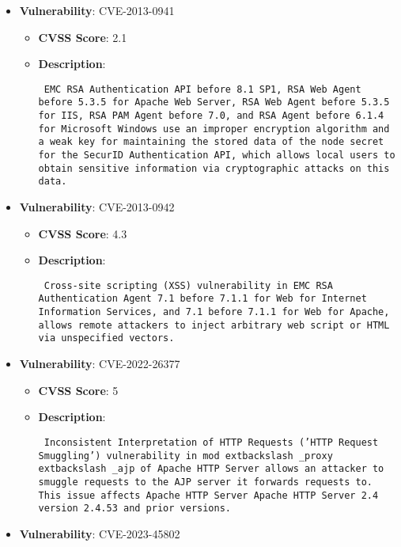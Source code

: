 \documentclass{article}
\begin{document}
\begin{itemize}
        \item \textbf{Vulnerability}: CVE-2013-0941
        \begin{itemize}
            \item \textbf{CVSS Score}:  2.1 
            \item \textbf{Description}: \parbox{\linewidth}{\texttt{ EMC RSA Authentication API before 8.1 SP1, RSA Web Agent before 5.3.5 for Apache Web Server, RSA Web Agent before 5.3.5 for IIS, RSA PAM Agent before 7.0, and RSA Agent before 6.1.4 for Microsoft Windows use an improper encryption algorithm and a weak key for maintaining the stored data of the node secret for the SecurID Authentication API, which allows local users to obtain sensitive information via cryptographic attacks on this data. }}
        \end{itemize}
    
        \item \textbf{Vulnerability}: CVE-2013-0942
        \begin{itemize}
            \item \textbf{CVSS Score}:  4.3 
            \item \textbf{Description}: \parbox{\linewidth}{\texttt{ Cross-site scripting (XSS) vulnerability in EMC RSA Authentication Agent 7.1 before 7.1.1 for Web for Internet Information Services, and 7.1 before 7.1.1 for Web for Apache, allows remote attackers to inject arbitrary web script or HTML via unspecified vectors. }}
        \end{itemize}
    
        \item \textbf{Vulnerability}: CVE-2022-26377
        \begin{itemize}
            \item \textbf{CVSS Score}:  5 
            \item \textbf{Description}: \parbox{\linewidth}{\texttt{ Inconsistent Interpretation of HTTP Requests ('HTTP Request Smuggling') vulnerability in mod	extbackslash _proxy	extbackslash _ajp of Apache HTTP Server allows an attacker to smuggle requests to the AJP server it forwards requests to. This issue affects Apache HTTP Server Apache HTTP Server 2.4 version 2.4.53 and prior versions. }}
        \end{itemize}
    
        \item \textbf{Vulnerability}: CVE-2023-45802
\end{itemize}
\end{document}
